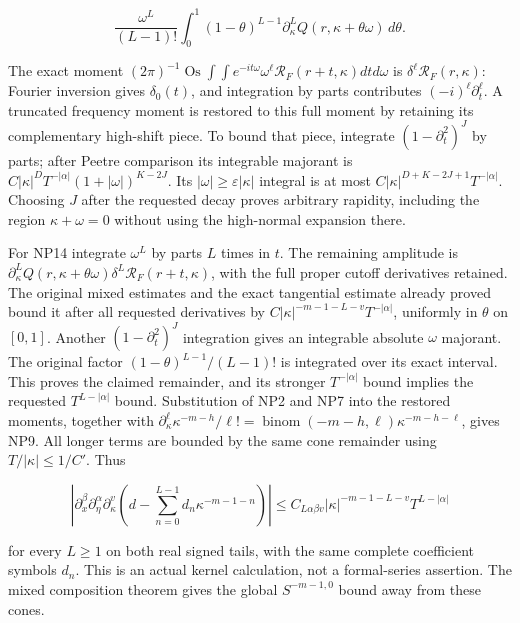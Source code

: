 \documentclass[
  11pt,
]{article}
\begin{document}
\[
 \frac{\omega^L}{(L-1)!}
 \int_0^1(1-\theta)^{L-1}
       \partial_\kappa^LQ(r,\kappa+\theta\omega)
       \,d\theta.
 \tag{NP14}
\]

The exact moment
\((2\pi )^{-1}\operatorname{Os} \int \int e^{-it\omega }\omega ^\ell \mathcal R _F(r+t,\kappa )dtd\omega \)
is \(\delta ^\ell \mathcal R _F(r,\kappa )\): Fourier inversion gives
\(\delta _0(t)\), and integration by parts contributes
\((-i)^\ell \partial _t^\ell \). A truncated frequency moment is restored
to this full moment by retaining its complementary high-shift piece. To
bound that piece, integrate \((1-\partial _t^2)^J\) by parts; after
Peetre comparison its integrable majorant is
\(C|\kappa |^D T^{-|\alpha |}(1+|\omega |)^{K-2J}\). Its
\(|\omega |\ge \varepsilon |\kappa |\) integral is at most
\(C|\kappa |^{D+K-2J+1}T^{-|\alpha |}\). Choosing \(J\) after the
requested decay proves arbitrary rapidity, including the region
\(\kappa +\omega =0\) without using the high-normal expansion there.

For NP14 integrate \(\omega ^L\) by parts \(L\) times in \(t\). The
remaining amplitude is
\(\partial _\kappa ^LQ(r,\kappa +\theta \omega )\delta ^L\mathcal R _F(r+t,\kappa )\),
with the full proper cutoff derivatives retained. The original mixed
estimates and the exact tangential estimate already proved bound it
after all requested derivatives by
\(C|\kappa |^{-m-1-L-v}T^{-|\alpha |}\), uniformly in \(\theta \) on
\([0,1]\). Another \((1-\partial _t^2)^J\) integration gives an
integrable absolute \(\omega \) majorant. The original factor
\((1-\theta )^{L-1}/(L-1)!\) is integrated over its exact interval. This
proves the claimed remainder, and its stronger \(T^{-|\alpha |}\) bound
implies the requested \(T^{L-|\alpha |}\) bound. Substitution of NP2 and
NP7 into the restored moments, together with
\(\partial _\kappa ^\ell \kappa ^{-m-h}/\ell !=\operatorname{binom}(-m-h,\ell )\kappa ^{-m-h-\ell }\),
gives NP9. All longer terms are bounded by the same cone remainder using
\(T/|\kappa |\le 1/C'\). Thus

\[
 \left|\partial_x^\beta\partial_\eta^\alpha\partial_\kappa^v
 \left(d-\sum_{n=0}^{L-1}d_n\kappa^{-m-1-n}\right)\right|
 \le C_{L\alpha\beta v}|\kappa|^{-m-1-L-v}T^{L-|\alpha|}
 \tag{NP15}
\]

for every \(L\ge1\) on both real signed tails, with the same complete
coefficient symbols \(d_n\). This is an actual kernel calculation, not a
formal-series assertion. The mixed composition theorem gives the global
\(S^{-m-1,0}\) bound away from these cones.
\end{document}
